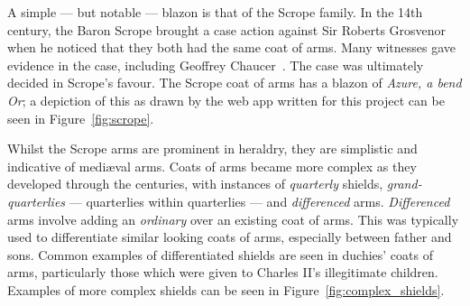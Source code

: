 \documentclass[nobib, a4paper, twoside, justified]{tufte-book}
\begin{document}
\begin{marginfigure}
  \centering
  \def\svgwidth{0.8\linewidth}
  
  \caption{\textit{Purpure, a chief Gules}.}\label{fig:chief_example}
\end{marginfigure}

A simple --- but notable --- blazon is that of the Scrope family. In the 14th century, the Baron
Scrope brought a case action against Sir Roberts Grosvenor when he noticed that they both had the
same coat of arms. Many witnesses gave evidence in the case, including Geoffrey
Chaucer~\autocite{scrope_grosvenor}. The case was ultimately decided in Scrope's favour. The Scrope
coat of arms has a blazon of \textit{Azure, a bend Or}; a depiction of this as drawn by the web app
written for this project can be seen in Figure~\ref{fig:scrope}.

\begin{marginfigure}
  \centering
  \def\svgwidth{0.8\linewidth}
  
  \caption{The Scrope escutcheon; \textit{Azure, a bend Or}.}\label{fig:scrope}
\end{marginfigure}


Whilst the Scrope arms are prominent in heraldry, they are simplistic and indicative of
medi\ae{}val arms. Coats of arms became more complex as they developed through the centuries, with
instances of \textit{quarterly} shields, \textit{grand-quarterlies} --- quarterlies within
quarterlies --- and \textit{differenced} arms. \textit{Differenced} arms involve adding an
\textit{ordinary} over an existing coat of arms. This was typically used to differentiate similar
looking coats of arms, especially between father and sons. Common examples of differentiated
shields are seen in duchies' coats of arms, particularly those which were given to Charles II's
illegitimate children. Examples of more complex shields can be seen in
Figure~\ref{fig:complex_shields}.

\begin{figure*}[h]
  \qquad
  \caption{Some examples of more complex coats of arms.}\label{fig:complex_shields}
\end{figure*}
\end{document}

